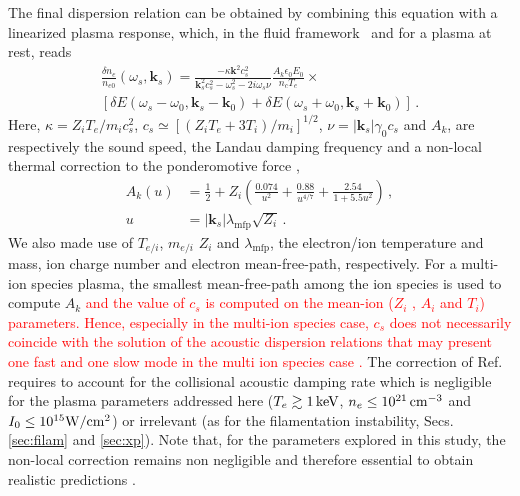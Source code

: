 \documentclass[
 reprint,
 superscriptaddress,
 amsmath,amssymb,
 aps,
]{revtex4-1}
\def\tc{\textcolor{red}}
\begin{document}
The final dispersion relation  can be obtained by combining this equation with a linearized plasma response, which, in the fluid framework~\cite{POP_Ruyer_2020} and for a plasma at rest, %
reads 
\begin{align}
   \frac{\delta n_e }{n_{e0}}(\omega_s,\mathbf{k}_s) = \frac{-\kappa\mathbf{k}^2c_s^2}{ \mathbf{k}_s^2c_s^2-\omega_s^2 -2i\omega_s \nu} \frac{A_k\epsilon_0 E_0}{n_c T_e}\times \nonumber\\ \left[\delta E(\omega_s-\omega_0, \mathbf{k}_s-\mathbf{k}_0) +\delta E(\omega_s+\omega_0, \mathbf{k}_s+\mathbf{k}_0) \right] \, .\label{eq:fluid}
\end{align}
Here, $\kappa = Z_iT_e/m_ic_s^2$,  $c_s\simeq [(Z_iT_e+3 T_i)/m_i]^{1/2}$, $\nu=\vert\mathbf{k}_s\vert \gamma_0 c_s$ and $A_k$, are respectively  the sound speed, the Landau damping frequency and a non-local thermal correction to the ponderomotive force \tc{\cite[]{POP_Kaiser_1993,Bychenkov_2000}}, 
\begin{align}
     A_k(u)   &= \frac{1}{2} +Z_i\left( \frac{0.074}{u^2}+ \frac{0.88}{u^{4/7}} + \frac{2.54}{1+5.5u^2} \right) \, ,\nonumber \\ 
     u &=\vert \mathbf{k}_s \vert\lambda_\mathrm{mfp} \sqrt{Z_i}\label{eq:nl}\, .
\end{align}
We also made use of $T_{e/i}$, $m_{e/i}$ $Z_i$ and $\lambda_\mathrm{mfp}$, the electron/ion temperature and mass, ion charge number and electron mean-free-path, respectively. For a multi-ion species plasma, the smallest mean-free-path among the ion species is used to compute $A_k$ \tc{ and the value of $c_s$ is computed on the mean-ion ($Z_i$ , $A_i$ and $T_i$) parameters. Hence, especially in the multi-ion species case, $c_s$ does not necessarily coincide with the solution of the acoustic dispersion relations that may present one fast and one slow mode in the multi ion species case  \cite[]{POF_Fried_71,POP_Williams_95}.}  
The correction of  Ref. \cite[]{Bychenkov_2000} requires to account for the collisional acoustic damping rate which is negligible for the plasma parameters addressed here ($T_e\gtrsim 1\,\rm keV$, $n_e\le 10^{21}\,\rm cm^{-3}$ and $I_0\le 10^{15}\rm W/cm^{2}$) or irrelevant (as for the filamentation instability, Secs.  \ref{sec:filam} and \ref{sec:xp}).
Note that, for the parameters explored in this study, the non-local correction remains non negligible and therefore essential to obtain realistic predictions \cite[]{PRL_Epperlein_1990,POP_Berger_2005}.  
\end{document}
